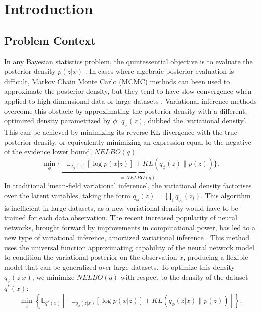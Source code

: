 \documentclass[honours,12pt, twoside]{unswthesis}
\newcommand{\E}{\mathbb{E}}
\numberwithin{equation}{section}
\theoremstyle{definition}
\begin{document}
\afterpreface
\afterpage{\clearpage}

\chapter{Introduction}\label{intro}
\section{Problem Context}
In any Bayesian statistics problem, the quintessential objective is to evaluate the posterior density $p(z|x)$ \citep{gelman}. In cases where algebraic posterior evaluation is difficult, Markov Chain Monte Carlo (MCMC) methods can been used to approximate the posterior density, but they tend to have slow convergence when applied to high dimensional data or large datasets \citep{blei}. Variational inference methods overcome this obstacle by approximating the posterior density with a different, optimized density parametrized by $\phi$: $q_\phi(z)$, dubbed the `variational density'. This can be achieved by minimizing its reverse KL divergence with the true posterior density, or equivalently minimizing an expression equal to the negative of the evidence lower bound, $NELBO(q)$ \citep{blei}
\[\min_\phi \lbrace\underbrace{-\E_{q_\phi(z)}[\log p(x|z)]+KL(q_\phi(z)\|p(z))}_{=NELBO(q)}\rbrace.\]
In traditional `mean-field variational inference', the variational density factorises over the latent variables, taking the form $q_\phi(z)=\prod_i q_{\phi_i}(z_i)$. This algorithm is inefficient in large datasets, as a new variational density would have to be trained for each data observation. The recent increased popularity of neural networks, brought forward by improvements in computational power, has led to a new type of variational inference, amortized variational inference \citep{ADVVI}. This method uses the universal function approximating capability of the neural network model to condition the variational posterior on the observation $x$, producing a flexible model that can be generalized over large datasets. To optimize this density $q_\phi(z|x)$, we minimize $NELBO(q)$ with respect to the density of the dataset $q^*(x)$: 
\[\min_{\phi} \left\lbrace\E_{q^*(x)}\left[-\E_{q_\phi(z|x)}[\log p(x|z)]+KL(q_\phi(z|x)\|p(z))\right]\right\rbrace.\]
\end{document}
